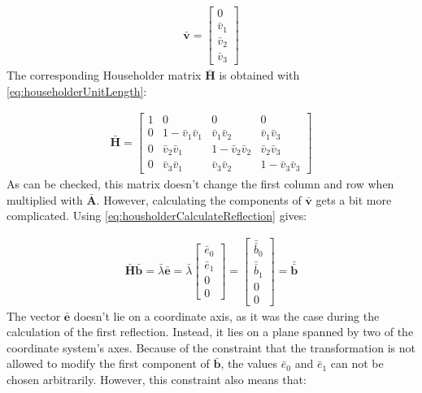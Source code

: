 \begin{align}
\label{eq:qrReflectionVector1Requirement}
\mathbf{\bar{v}}
= 
\begin{bmatrix}
0\\
\bar{v}_1\\
\bar{v}_2\\
\bar{v}_3
\end{bmatrix}
\end{align}
%
The corresponding Householder matrix $\mathbf{\bar{H}}$ is obtained with \cref{eq:householderUnitLength}:

\begin{align}
\mathbf{\bar{H}}
=
\begin{bmatrix}
1    &0                   &0                   &0                   \\
0    &1-\bar{v}_1\bar{v}_1&  \bar{v}_1\bar{v}_2&  \bar{v}_1\bar{v}_3\\
0    &  \bar{v}_2\bar{v}_1&1-\bar{v}_2\bar{v}_2&  \bar{v}_2\bar{v}_3\\
0    &  \bar{v}_3\bar{v}_1&  \bar{v}_3\bar{v}_2&1-\bar{v}_3\bar{v}_3
\end{bmatrix}					  
\end{align}
%
As can be checked, this matrix doesn't change the first column and row when multiplied with $\mathbf{\bar{A}}$.
However, calculating the components of $\mathbf{\bar{v}}$ gets a bit more complicated.
Using \cref{eq:housholderCalculateReflection} gives:

\begin{align}
\mathbf{\bar{H}} \mathbf{\bar{b}} 
= 
\bar{\lambda} \mathbf{\bar{e}}
= 
\bar{\lambda} 
\begin{bmatrix}
\bar{e}_0\\
\bar{e}_1\\
0\\
0
\end{bmatrix}
=  
\begin{bmatrix}
\bar{\bar{b}}_0\\
\bar{\bar{b}}_1\\
0\\
0
\end{bmatrix}
= 
\mathbf{\bar{\bar{b}}} 
\end{align}
%
The vector $\mathbf{\bar{e}}$ doesn't lie on a coordinate axis, as it was the case during the calculation of the first reflection.
Instead, it lies on a plane spanned by two of the coordinate system's axes.
Because of the constraint that the transformation is not allowed to modify the first component of $\mathbf{\bar{b}}$, the values $\bar{e}_0$ and $\bar{e}_1$ can not be chosen arbitrarily.
However, this constraint also means that:

